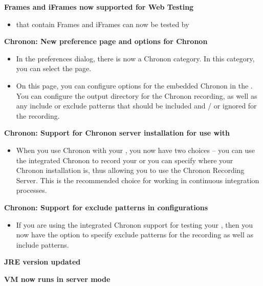 \textbf{Frames and iFrames now supported for Web Testing}
\begin{itemize}
\item \gdauts{} that contain Frames and iFrames can now be tested by \app{}
\end{itemize}

\textbf{Chronon: New preference page and options for \ite{} Chronon}
\begin{itemize}
\item In the preferences dialog, there is now a Chronon category. In this category, you can select the  page. 
\item On this page, you can configure options for the embedded Chronon in the \ite{}. You can configure the output directory for the Chronon recording, as well as any include or exclude patterns that should be included and / or ignored for the recording.  
\end{itemize}

\textbf{Chronon: Support for Chronon server installation for use with \gdauts{}}
\begin{itemize}
\item When you use Chronon with your \gdaut{}, you now have two choices -- you can use the integrated Chronon to record your \gdaut{} or you can specify where your Chronon installation is, thus allowing you to use the Chronon Recording Server. This is the recommended choice for working in continuous integration processes.   
\end{itemize}

\textbf{Chronon: Support for exclude patterns in \gdaut{} configurations}
\begin{itemize}
\item If you are using the integrated Chronon support for testing your \gdaut{}, then you now have the option to specify exclude patterns for the recording as well as include patterns. 
\end{itemize}

\textbf{JRE version updated}

\textbf{VM now runs in server mode}
